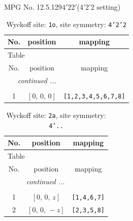 \documentclass[fleqn,8pt]{jsarticle}
\begin{document}
\setcounter{MaxMatrixCols}{32}

\renewcommand{\tablename}{Table~}
\renewcommand{\figurename}{Figure~}
\begin{center}
\LARGE
MPG No. 12.5.129\quad$4'22'$\quad(4'2'2 setting)
\end{center}
\renewcommand{\arraystretch}{1.2}
\begin{longtable}{ccc}
\caption{Wyckoff site: {\tt 1o}, site symmetry: {\tt 4'2'2}}
 \\
 \hline \hline
No. & position & mapping \\ \hline \endfirsthead

\multicolumn{2}{l}{\tablename\ \thetable{}} \\
 \hline \hline
No. & position & mapping \\ \hline \endhead

 \hline \hline
\multicolumn{2}{r}{\footnotesize\it continued ...} \\ \endfoot

 \hline \hline
\multicolumn{2}{r}{} \\ \endlastfoot

1 & $\left[ 0,\, 0,\, 0 \right]$ & {\tt [1,2,3,4,5,6,7,8]} \\
\end{longtable}
\renewcommand{\arraystretch}{1.2}
\begin{longtable}{ccc}
\caption{Wyckoff site: {\tt 2a}, site symmetry: {\tt 4'..}}
 \\
 \hline \hline
No. & position & mapping \\ \hline \endfirsthead

\multicolumn{2}{l}{\tablename\ \thetable{}} \\
 \hline \hline
No. & position & mapping \\ \hline \endhead

 \hline \hline
\multicolumn{2}{r}{\footnotesize\it continued ...} \\ \endfoot

 \hline \hline
\multicolumn{2}{r}{} \\ \endlastfoot

1 & $\left[ 0,\, 0,\, z \right]$ & {\tt [1,4,6,7]} \\ \hline
2 & $\left[ 0,\, 0,\, - z \right]$ & {\tt [2,3,5,8]} \\
\end{longtable}
\renewcommand{\arraystretch}{1.2}
\end{document}
